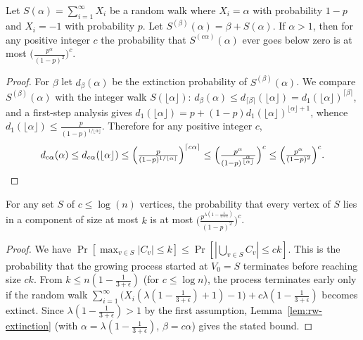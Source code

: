 \begin{lemma}
  \label{lem:rw-extinction}
  Let $S(\alpha) = \sum_{i=1}^{\infty} X_i$ be a random walk where
  $X_i = \alpha$ with probability $1-p$ and $X_i = -1$ with probability $p$. Let
  $S^{(\beta)}(\alpha) = \beta + S(\alpha)$. If $\alpha > 1$, then for any
  positive integer $c$ the probability that $S^{(c\alpha)}(\alpha)$ ever goes
  below zero is at most $\Big(\tfrac{p^{\alpha}}{(1-p)^2}\Big)^c$.
\end{lemma}
\begin{proof}
  For $\beta$ let $d_\beta(\alpha)$ be the extinction probability of
  $S^{(\beta)}(\alpha)$. We compare $S^{(\beta)}(\alpha)$ with the integer walk
  $S(\lfloor \alpha\rfloor)$: $d_\beta(\alpha) \le d_{\lceil\beta\rceil}(\lfloor\alpha\rfloor)
  = d_1(\lfloor\alpha\rfloor)^{\lceil\beta\rceil}$, and a first-step analysis
  gives $d_1(\lfloor\alpha\rfloor) = p + (1-p)d_1(\lfloor\alpha\rfloor)^{\lfloor\alpha\rfloor+1}$,
  whence $d_1(\lfloor\alpha\rfloor) \le \tfrac{p}{(1-p)^{1/\lfloor\alpha\rfloor}}$.
  Therefore for any positive integer $c$,
  \[
    d_{c\alpha}(\alpha) \le d_{c\alpha}(\lfloor\alpha\rfloor)
      \le \Big(\tfrac{p}{(1-p)^{1/\lfloor\alpha\rfloor}}\Big)^{\lceil c\alpha\rceil}
      \le \Big(\tfrac{p^{\alpha}}{(1-p)^{\frac{\alpha}{\lfloor\alpha\rfloor}}}\Big)^c
      \le \Big(\tfrac{p^{\alpha}}{(1-p)^2}\Big)^c . \qedhere
  \]
\end{proof}

\begin{lemma}
  \label{lem:claim-set-components}
  For any set $S$ of $c \le \log(n)$ vertices, the probability that every vertex
  of $S$ lies in a component of size at most $k$ is at most
  $\Big(\tfrac{p^{\lambda(1-\frac{1}{3+\epsilon})}}{(1-p)^2}\Big)^c$.
\end{lemma}
\begin{proof}
  We have $\Pr[\max_{v\in S}|C_v| \le k] \le \Pr[|\bigcup_{v\in S}C_v| \le ck]$.
  This is the probability that the growing process started at $V_0 = S$
  terminates before reaching size $ck$. From $k \le n(1 - \tfrac{1}{3+\epsilon})$
  (for $c \le \log n$), the process terminates early only if the random walk
  $\sum_{i=1}^{\infty}\big(X_i(\lambda(1-\tfrac1{3+\epsilon})+1) - 1\big)
   + c\lambda(1-\tfrac1{3+\epsilon})$ becomes extinct. Since
  $\lambda(1-\tfrac1{3+\epsilon}) > 1$ by the first assumption,
  Lemma~\ref{lem:rw-extinction} (with $\alpha = \lambda(1-\tfrac1{3+\epsilon})$,
  $\beta = c\alpha$) gives the stated bound.
\end{proof}

